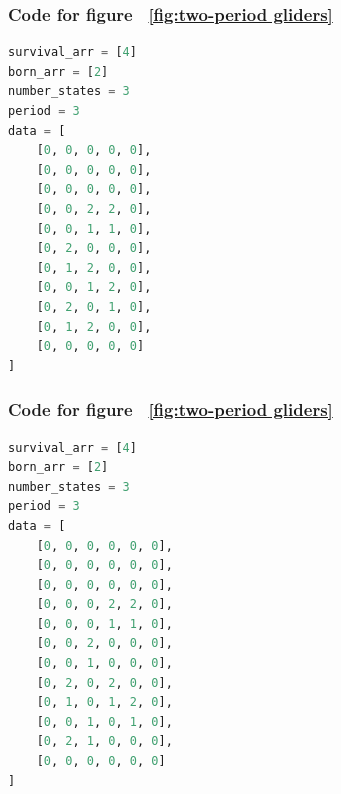 \documentclass[12pt]{article}
\numberwithin{figure}{section} %
\begin{document}
\noindent\begin{minipage}{.45\textwidth}
\subsubsection{Code for figure ~\ref{fig:two-period gliders}}
\label{subsubsection:two-period gliders(2/5)}
\begin{lstlisting}[language = Python]
survival_arr = [4]
born_arr = [2]
number_states = 3
period = 3
data = [
    [0, 0, 0, 0, 0],
    [0, 0, 0, 0, 0],
    [0, 0, 0, 0, 0],
    [0, 0, 2, 2, 0],
    [0, 0, 1, 1, 0],
    [0, 2, 0, 0, 0],
    [0, 1, 2, 0, 0],
    [0, 0, 1, 2, 0],
    [0, 2, 0, 1, 0],
    [0, 1, 2, 0, 0],
    [0, 0, 0, 0, 0]
]
\end{lstlisting}
\end{minipage}\hfill
\begin{minipage}{.45\textwidth}
\subsubsection{Code for figure ~\ref{fig:two-period gliders}}
\label{subsubsection:two-period gliders(3/5)}
\begin{lstlisting}[language = Python]
survival_arr = [4]
born_arr = [2]
number_states = 3
period = 3
data = [
    [0, 0, 0, 0, 0, 0],
    [0, 0, 0, 0, 0, 0],
    [0, 0, 0, 0, 0, 0],
    [0, 0, 0, 2, 2, 0],
    [0, 0, 0, 1, 1, 0],
    [0, 0, 2, 0, 0, 0],
    [0, 0, 1, 0, 0, 0],
    [0, 2, 0, 2, 0, 0],
    [0, 1, 0, 1, 2, 0],
    [0, 0, 1, 0, 1, 0],
    [0, 2, 1, 0, 0, 0],
    [0, 0, 0, 0, 0, 0]
]
\end{lstlisting}
\end{minipage}
\end{document}
